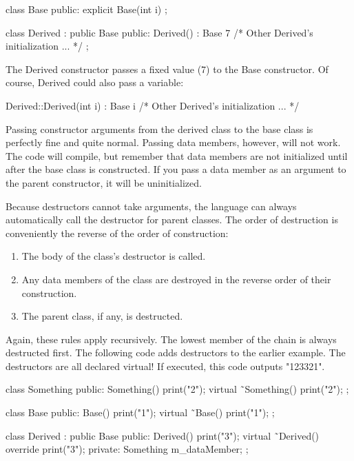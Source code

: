 \begin{cpp}
class Base
{
    public:
        explicit Base(int i) {}
};

class Derived : public Base
{
    public:
        Derived() : Base { 7 } { /* Other Derived's initialization ... */ }
};
\end{cpp}

The Derived constructor passes a fixed value (7) to the Base constructor. Of course, Derived could also pass a variable:

\begin{cpp}
Derived::Derived(int i) : Base { i } { /* Other Derived's initialization ... */ }
\end{cpp}

Passing constructor arguments from the derived class to the base class is perfectly fine and quite normal. Passing data members, however, will not work. The code will compile, but remember that data members are not initialized until after the base class is constructed. If you pass a data member as an argument to the parent constructor, it will be uninitialized.


Because destructors cannot take arguments, the language can always automatically call the destructor for parent classes. The order of destruction is conveniently the reverse of the order of construction:

\begin{enumerate}
\item
The body of the class’s destructor is called.

\item
Any data members of the class are destroyed in the reverse order of their construction.

\item
The parent class, if any, is destructed.
\end{enumerate}

Again, these rules apply recursively. The lowest member of the chain is always destructed first. The following code adds destructors to the earlier example. The destructors are all declared virtual! If executed, this code outputs "123321".

\begin{cpp}
class Something
{
    public:
        Something() { print("2"); }
        virtual ˜Something() { print("2"); }
};

class Base
{
    public:
        Base() { print("1"); }
        virtual ˜Base() { print("1"); }
};

class Derived : public Base
{
    public:
        Derived() { print("3"); }
        virtual ˜Derived() override { print("3"); }
    private:
        Something m_dataMember;
};
\end{cpp}

